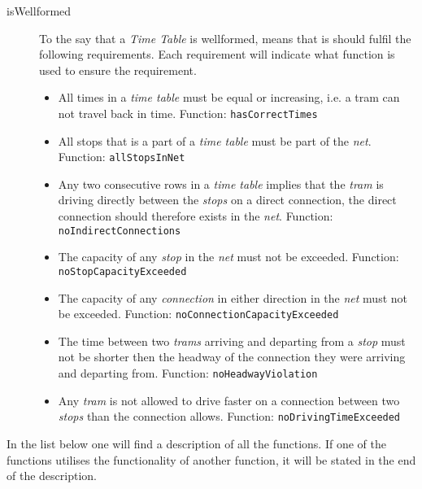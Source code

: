 \documentclass[a4]{article}
\begin{document}
\begin{description}
    \item[isWellformed] To the say that a \emph{Time Table} is wellformed, means that is should fulfil the following requirements. Each requirement will indicate what function is used to ensure the requirement.
        \begin{itemize}
            \item All times in a \emph{time table} must be equal or increasing, i.e. a tram can not travel back in time. Function: \verb=hasCorrectTimes=
            \item All stops that is a part of a \emph{time table} must be part of the \emph{net}. Function: \verb=allStopsInNet=
            \item Any two consecutive rows in a \emph{time table} implies that the \emph{tram} is driving directly between the \emph{stops} on a direct connection, the direct connection should therefore exists in the \emph{net}. Function: \verb=noIndirectConnections=
            \item The capacity of any \emph{stop} in the \emph{net} must not be exceeded. Function: \verb=noStopCapacityExceeded=
            \item The capacity of any \emph{connection} in either direction in the \emph{net} must not be exceeded. Function: \verb=noConnectionCapacityExceeded=
            \item The time between two \emph{trams} arriving and departing from a \emph{stop} must not be shorter then the headway of the connection they were arriving and departing from. Function: \verb=noHeadwayViolation=
            \item Any \emph{tram} is not allowed to drive faster on a connection between two \emph{stops} than the connection allows. Function: \verb=noDrivingTimeExceeded=
        \end{itemize}
\end{description}

\noindent In the list below one will find a description of all the functions. If one of the functions utilises the functionality of another function, it will be stated in the end of the description. \\
\end{document}

